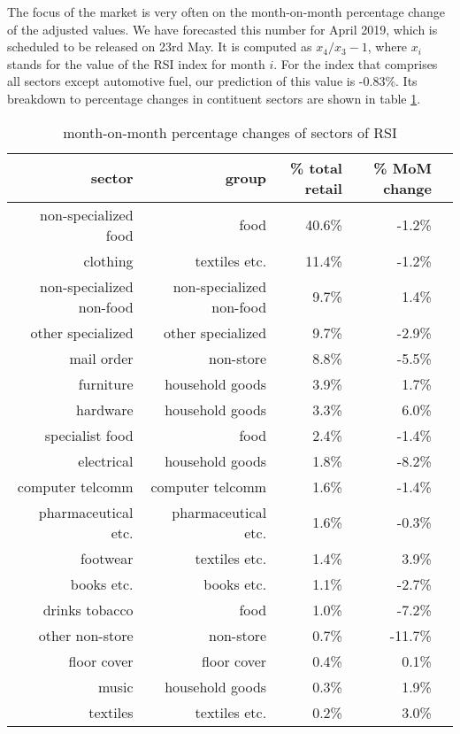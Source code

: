 \documentclass[a4paper,11pt,pdftex,twoside,titlepage]{article}
\begin{document}
The focus of the market is very often on the month-on-month percentage
change of the adjusted values. We have forecasted this number for
April 2019, which is scheduled to be released on 23rd May. It is
computed as $x_4/x_3 - 1$, where $x_i$ stands for the value of the
RSI index for month $i$. For the index that comprises all sectors
except automotive fuel, our prediction of this value is -0.83\%. Its
breakdown to percentage changes in contituent sectors are shown in
table \ref{tab:sector5t5y}.
\begin{table}[htb!]
  \centering
  \begin{tabular}{r|r|r|r|r}
    sector & group & \% total retail & \% MoM change\\
    \hline \hline
    non-specialized food & food & 40.6\% & -1.2\%\\
    clothing & textiles etc. & 11.4\% & -1.2\%\\
    non-specialized non-food & non-specialized non-food & 9.7\% & 1.4\%\\
    other specialized & other specialized & 9.7\% & -2.9\%\\
    mail order & non-store & 8.8\% & -5.5\%\\
    furniture & household goods & 3.9\% & 1.7\%\\
    hardware & household goods & 3.3\% & 6.0\%\\
    specialist food & food & 2.4\% & -1.4\%\\
    electrical & household goods & 1.8\% & -8.2\%\\
    computer telcomm & computer telcomm & 1.6\% & -1.4\%\\
    pharmaceutical etc. & pharmaceutical etc. & 1.6\% & -0.3\%\\
    footwear & textiles etc. & 1.4\% & 3.9\%\\
    books etc. & books etc. & 1.1\% & -2.7\%\\
    drinks tobacco & food & 1.0\% & -7.2\%\\
    other non-store & non-store & 0.7\% & -11.7\%\\
    floor cover & floor cover & 0.4\% & 0.1\%\\
    music & household goods & 0.3\% & 1.9\%\\
    textiles & textiles etc. & 0.2\% & 3.0\%\\
  \end{tabular}
  \caption{month-on-month percentage changes of sectors of RSI}
  \label{tab:sector5t5y}
\end{table}
\end{document}

